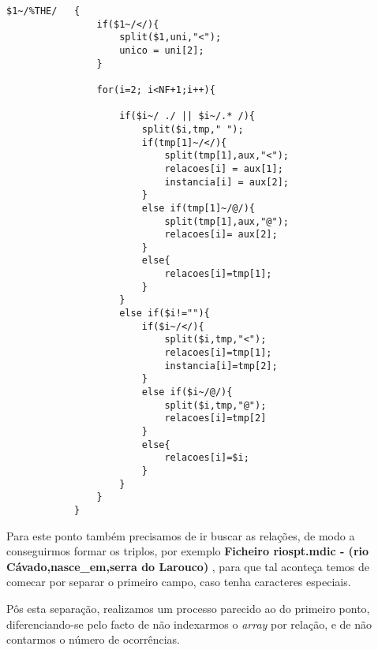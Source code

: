 \documentclass{report}
\begin{document}
\begin{verbatim}
$1~/%THE/   { 
                if($1~/</){
                    split($1,uni,"<");
                    unico = uni[2];
                }

                for(i=2; i<NF+1;i++){
                    
                    if($i~/ ./ || $i~/.* /){
                        split($i,tmp," ");
                        if(tmp[1]~/</){
                            split(tmp[1],aux,"<");
                            relacoes[i] = aux[1];
                            instancia[i] = aux[2];
                        } 
                        else if(tmp[1]~/@/){
                            split(tmp[1],aux,"@");
                            relacoes[i]= aux[2];
                        }
                        else{
                            relacoes[i]=tmp[1];
                        }
                    }
                    else if($i!=""){
                        if($i~/</){
                            split($i,tmp,"<");
                            relacoes[i]=tmp[1];
                            instancia[i]=tmp[2];
                        }
                        else if($i~/@/){
                            split($i,tmp,"@");
                            relacoes[i]=tmp[2]
                        }
                        else{ 
                            relacoes[i]=$i;
                        }
                    }
                }
            }
\end{verbatim}

    Para este ponto também precisamos de ir buscar as relações, de modo a conseguirmos formar os triplos, por exemplo \textbf{Ficheiro riospt.mdic - (rio Cávado,nasce\_em,serra do Larouco) }, para que tal aconteça temos de comecar por separar o primeiro campo, caso tenha caracteres especiais. 

    Pôs esta separação, realizamos um processo parecido ao do primeiro ponto, diferenciando-se pelo facto de não indexarmos o \textit{array} por relação, e de não contarmos o número de ocorrências.    
\end{document}
